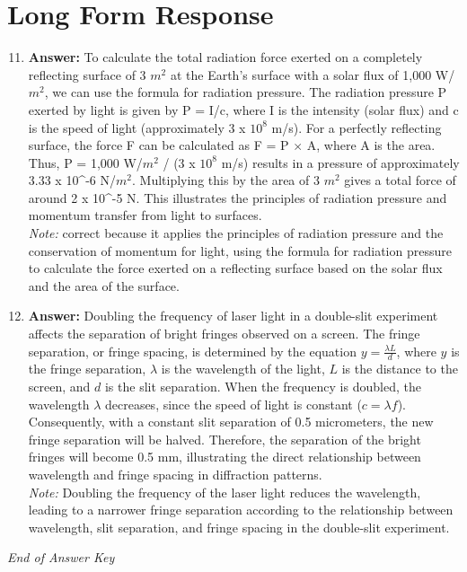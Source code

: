 \documentclass[12pt]{article}
\begin{document}
\section*{Long Form Response}
\begin{enumerate}[label=\arabic*.]
\setcounter{enumi}{10}
\item \textbf{Answer:} To calculate the total radiation force exerted on a completely reflecting surface of 3 $m^2$ at the Earth's surface with a solar flux of 1,000 W/$m^2$, we can use the formula for radiation pressure. The radiation pressure P exerted by light is given by P = I/c, where I is the intensity (solar flux) and c is the speed of light (approximately 3 x $10^8$ m/s). For a perfectly reflecting surface, the force F can be calculated as F = P \ensuremath{\times} A, where A is the area. Thus, P = 1,000 W/$m^2$ / (3 x $10^8$ m/s) results in a pressure of approximately 3.33 x 10^-6 N/$m^2$. Multiplying this by the area of 3 $m^2$ gives a total force of around 2 x 10^-5 N. This illustrates the principles of radiation pressure and momentum transfer from light to surfaces.
\\ \textit{Note:} correct because it applies the principles of radiation pressure and the conservation of momentum for light, using the formula for radiation pressure to calculate the force exerted on a reflecting surface based on the solar flux and the area of the surface.
\item \textbf{Answer:} Doubling the frequency of laser light in a double-slit experiment affects the separation of bright fringes observed on a screen. The fringe separation, or fringe spacing, is determined by the equation \( y = \frac{\lambda L}{d} \), where \( y \) is the fringe separation, \( \lambda \) is the wavelength of the light, \( L \) is the distance to the screen, and \( d \) is the slit separation. When the frequency is doubled, the wavelength \( \lambda \) decreases, since the speed of light is constant (\( c = \lambda f \)). Consequently, with a constant slit separation of 0.5 micrometers, the new fringe separation will be halved. Therefore, the separation of the bright fringes will become 0.5 mm, illustrating the direct relationship between wavelength and fringe spacing in diffraction patterns.
\\ \textit{Note:} Doubling the frequency of the laser light reduces the wavelength, leading to a narrower fringe separation according to the relationship between wavelength, slit separation, and fringe spacing in the double-slit experiment.
\end{enumerate}

\vfill
\noindent\textit{End of Answer Key}
\end{document}
